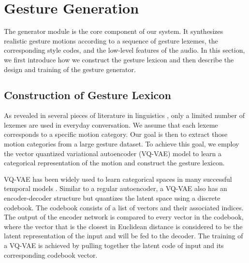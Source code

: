 \section{Gesture Generation}
\label{sec:gesture_generation}
The generator module is the core component of our system. It synthesizes realistic gesture motions according to a sequence of gesture lexemes, the corresponding style codes, and the low-level features of the audio. In this section, we first introduce how we construct the gesture lexicon and then describe the design and training of the gesture generator.

\subsection{Construction of Gesture Lexicon}
\label{subsec:gesture_style_embedding}
As revealed in several pieces of literature in linguistics \cite{Neff2008Gesture,Kipp2004_Gesture,Webb1996_Linguistic}, only a limited number of lexemes are used in everyday conversation. We assume that each lexeme corresponds to a specific motion category. Our goal is then to extract those motion categories from a large gesture dataset. To achieve this goal, we employ the vector quantized variational autoencoder (VQ-VAE) model \cite{oord2017neural} to learn a categorical representation of the motion and construct the gesture lexicon.

VQ-VAE has been widely used to learn categorical spaces in many successful temporal models \cite{prafulla2020jukebox, baevski2020vq-wav2vec, yan2021videogpt,ramesh2021DALLE}. Similar to a regular autoencoder, a VQ-VAE also has an encoder-decoder structure but quantizes the latent space using a discrete codebook. The codebook consists of a list of vectors and their associated indices. The output of the encoder network is compared to every vector in the codebook, where the vector that is the closest in Euclidean distance is considered to be the latent representation of the input and will be fed to the decoder. The training of a VQ-VAE is achieved by pulling together the latent code of input and its corresponding codebook vector.


